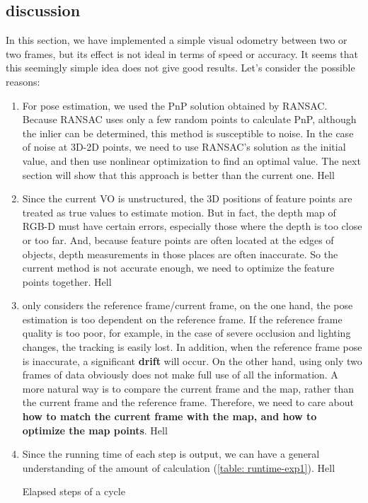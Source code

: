 \subsection{discussion}
In this section, we have implemented a simple visual odometry between two or two frames, but its effect is not ideal in terms of speed or accuracy. It seems that this seemingly simple idea does not give good results. Let's consider the possible reasons:

\begin{enumerate}
\item
For pose estimation, we used the PnP solution obtained by RANSAC. Because RANSAC uses only a few random points to calculate PnP, although the inlier can be determined, this method is susceptible to noise. In the case of noise at 3D-2D points, we need to use RANSAC's solution as the initial value, and then use nonlinear optimization to find an optimal value. The next section will show that this approach is better than the current one.
Hell
\item
Since the current VO is unstructured, the 3D positions of feature points are treated as true values ​​to estimate motion. But in fact, the depth map of RGB-D must have certain errors, especially those where the depth is too close or too far. And, because feature points are often located at the edges of objects, depth measurements in those places are often inaccurate. So the current method is not accurate enough, we need to optimize the feature points together.
Hell
\item only considers the reference frame/current frame, on the one hand, the pose estimation is too dependent on the reference frame. If the reference frame quality is too poor, for example, in the case of severe occlusion and lighting changes, the tracking is easily lost. In addition, when the reference frame pose is inaccurate, a significant \textbf{drift} will occur. On the other hand, using only two frames of data obviously does not make full use of all the information. A more natural way is to compare the current frame and the map, rather than the current frame and the reference frame. Therefore, we need to care about \textbf{how to match the current frame with the map, and how to optimize the map points}.
Hell
\item Since the running time of each step is output, we can have a general understanding of the amount of calculation (\autoref{table: runtime-exp1}).
Hell
\begin{table}[!ht]
\centering
\caption{Elapsed steps of a cycle}

\end{table}
\end{enumerate}
